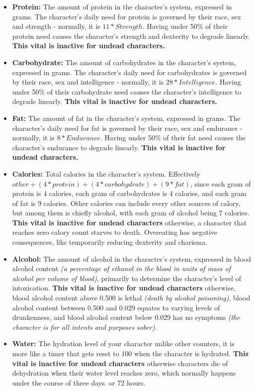\begin{itemize}
\item \textbf{Protein:} The amount of protein in the character's system, expressed in grams. The character's daily need for protein is governed by their race, sex and strength - normally, it is $11*Strength$. Having under 50\% of their protein need causes the character's strength and dexterity to degrade linearly. \textbf{This vital is inactive for undead characters.}
\item \textbf{Carbohydrate:} The amount of carbohydrates in the character's system, expressed in grams. The character's daily need for carbohydrates is governed by their race, sex and intelligence - normally, it is $28*Intelligence$. Having under 50\% of their carbohydrate need causes the character's intelligence to degrade linearly. \textbf{This vital is inactive for undead characters.}
\item \textbf{Fat:} The amount of fat in the character's system, expressed in grams. The character's daily need for fat is governed by their race, sex and endurance - normally, it is $8*Endurance$. Having under 50\% of their fat need causes the character's endurance to degrade linearly. \textbf{This vital is inactive for undead characters.}
\item \textbf{Calories:} Total calories in the character's system. Effectively $other+(4*protein)+(4*carbohydrate)+(9*fat)$, since each gram of protein is 4 calories, each gram of carbohydrates is 4 calories, and each gram of fat is 9 calories. Other calories can include every other sources of calory, but among them is chiefly alcohol, with each gram of alcohol being 7 calories. \textbf{This vital is inactive for undead characters} \textemdash otherwise, a character that reaches zero calory count starves to death. Overeating has negative consequences, like temporarily reducing dexterity and charisma.
\item \textbf{Alcohol:} The amount of alcohol in the character's system, expressed in blood alcohol content \textit{(a percentage of ethanol in the blood in units of mass of alcohol per volume of blood)}, primarily to determine the character's level of intoxication. \textbf{This vital is inactive for undead characters} \textemdash otherwise, blood alcohol content above 0.500 is lethal \textit{(death by alcohol poisoning)}, blood alcohol content between 0.500 and 0.029 equates to varying levels of drunkenness, and blood alcohol content below 0.029 has no symptoms \textit{(the character is for all intents and purposes sober)}.
\item \textbf{Water:} The hydration level of your character \textemdash unlike other counters, it is more like a timer that gets reset to 100 when the character is hydrated. \textbf{This vital is inactive for undead characters} \textemdash otherwise characters die of dehydration when their water level reaches zero, which normally happens under the course of three days. or 72 hours.

\end{itemize}
